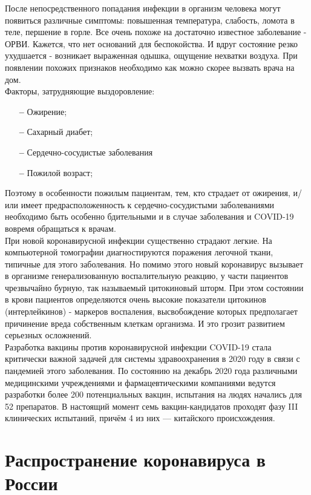 \documentclass[a4paper, 12pt]{extarticle}
\begin{document}
После непосредственного попадания инфекции в организм человека могут появиться
различные симптомы: повышенная температура, слабость, ломота в теле, першение в горле.
Все очень похоже на достаточно известное заболевание - ОРВИ. Кажется, что нет
оснований для беспокойства. И вдруг состояние резко ухудшается - возникает
выраженная одышка, ощущение нехватки воздуха. При появлении похожих признаков
необходимо как можно скорее вызвать врача на дом.
\\

Факторы, затрудняющие выздоровление:
\begin{itemize}
    \item[\bfseries--] Ожирение;
    \item[\bfseries--] Сахарный диабет;
    \item[\bfseries--] Сердечно-сосудистые заболевания
    \item[\bfseries--] Пожилой возраст;
\end{itemize}

Поэтому в особенности пожилым пациентам, тем, кто страдает от ожирения, и/или имеет
предрасположенность к сердечно-сосудистыми заболеваниями необходимо быть
особенно бдительными и в случае заболевания и COVID-19 вовремя обращаться к
врачам.
\\

При новой коронавирусной инфекции существенно страдают легкие. На компьютерной
томографии диагностируются поражения легочной ткани, типичные для этого
заболевания. Но помимо этого новый коронавирус вызывает в организме
генерализованную воспалительную реакцию, у части пациентов чрезвычайно бурную,
так называемый цитокиновый шторм. При этом состоянии в крови пациентов
определяются очень высокие показатели цитокинов (интерлейкинов) - маркеров
воспаления, высвобождение которых предполагает причинение вреда собственным
клеткам организма. И это грозит развитием серьезных осложнений.
\\

Разработка вакцины против коронавирусной инфекции COVID-19 стала критически важной задачей для системы здравоохранения в 2020 году в связи с пандемией этого заболевания. По состоянию на декабрь 2020 года различными медицинскими учреждениями и фармацевтическими компаниями ведутся разработки более 200 потенциальных вакцин, испытания на людях начались для 52 препаратов. В настоящий момент семь вакцин-кандидатов проходят фазу III клинических испытаний, причём 4 из них — китайского происхождения.
\newpage

\section{Распространение коронавируса в России}
\end{document}
